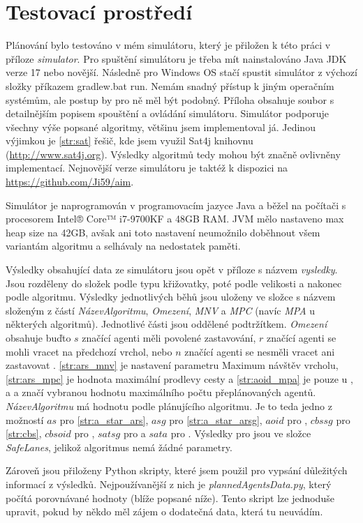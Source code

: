 \section{Testovací prostředí}\label{sec:testovaci_prostredi}

Plánování bylo testováno v mém simulátoru, který je přiložen k této práci v příloze \textit{simulator}.
Pro spuštění simulátoru je třeba mít nainstalováno Java JDK verze 17 nebo novější.
Následně pro Windows OS stačí spustit simulátor z výchozí složky příkazem \textrm{gradlew.bat run}.
Nemám snadný přístup k jiným operačním systémům, ale postup by pro ně měl být podobný.
Příloha obsahuje soubor s detailnějším popisem spouštění a ovládání simulátoru.
Simulátor podporuje všechny výše popsané algoritmy, většinu jsem implementoval já.
Jedinou výjimkou je \ref{str:sat} řešič, kde jsem využil Sat4j knihovnu (\href{http://www.sat4j.org}{http://www.sat4j.org}).
Výsledky algoritmů tedy mohou být značně ovlivněny implementací.
Nejnovější verze simulátoru je taktéž k dispozici na \href{https://github.com/Ji59/aim}{https://github.com/Ji59/aim}.

Simulátor je naprogramován v programovacím jazyce Java a
běžel na počítači s procesorem Intel® Core™ i7-9700KF a 48GB RAM\@.
JVM mělo nastaveno max heap size na 42GB,
avšak ani toto nastavení neumožnilo doběhnout všem variantám algoritmu 
a selhávaly na nedostatek paměti.

Výsledky obsahující data ze simulátoru jsou opět v příloze s názvem \textit{vysledky}.
Jsou rozděleny do složek podle typu křižovatky, poté podle velikosti a nakonec podle algoritmu.
Výsledky jednotlivých běhů jsou uloženy ve složce s názvem složeným z částí \textit{NázevAlgoritmu},
\textit{Omezení}, \textit{MNV} a \textit{MPC} (navíc \textit{MPA} u některých algoritmů).
Jednotlivé části jsou oddělené podtržítkem.
\textit{Omezení} obsahuje buďto $s$ značící agenti měli povolené zastavování,
$r$ značící agenti se mohli vracet na předchozí vrchol, nebo $n$ značící agenti se nesměli vracet ani zastavovat .
\ref{str:ars_mnv} je nastavení parametru Maximum návštěv vrcholu,
\ref{str:ars_mpc} je hodnota maximální prodlevy cesty a \ref{str:aoid_mpa} je pouze u ,
 a  a značí vybranou hodnotu maximálního počtu přeplánovaných agentů.
\textit{NázevAlgoritmu} má hodnotu podle plánujícího algoritmu.
Je to teda jedno z možností $as$ pro \ref{str:a_star_ars}, $asg$ pro \ref{str:a_star_arsg},
$aoid$ pro , $cbssg$ pro \ref{str:cbs}, $cbsoid$ pro ,
$satsg$ pro  a $sata$ pro .
Výsledky pro  jsou ve složce \textit{SafeLanes}, jelikož algoritmus nemá žádné parametry.

Zároveň jsou přiloženy Python skripty, které jsem použil pro vypsání důležitých informací z výsledků.
Nejpoužívanější z nich je \textit{plannedAgentsData.py}, který počítá porovnávané hodnoty (blíže popsané níže).
Tento skript lze jednoduše upravit, pokud by někdo měl zájem o dodatečná data, která tu neuvádím.
